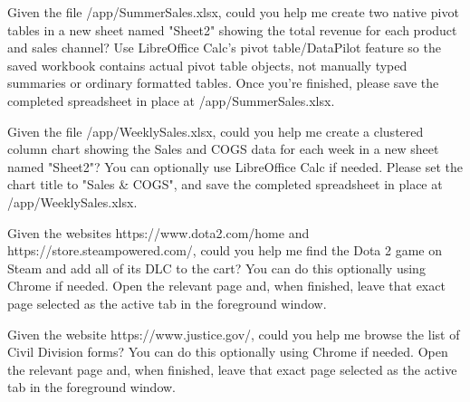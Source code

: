 \documentclass{llmxive}
\begin{document}
\begin{instructionbox}
Given the file \textasciigrave{}/app/SummerSales.xlsx\textasciigrave{}, could you help me create two native pivot tables in a new sheet named "Sheet2" showing the total revenue for each product and sales channel? Use LibreOffice Calc's pivot table/DataPilot feature so the saved workbook contains actual pivot table objects, not manually typed summaries or ordinary formatted tables. Once you're finished, please save the completed spreadsheet in place at \textasciigrave{}/app/SummerSales.xlsx\textasciigrave{}.
\end{instructionbox}

\begin{instructionbox}
Given the file \textasciigrave{}/app/WeeklySales.xlsx\textasciigrave{}, could you help me create a clustered column chart showing the Sales and COGS data for each week in a new sheet named "Sheet2"? You can optionally use LibreOffice Calc if needed. Please set the chart title to "Sales \& COGS", and save the completed spreadsheet in place at \textasciigrave{}/app/WeeklySales.xlsx\textasciigrave{}.
\end{instructionbox}

\begin{instructionbox}
Given the websites \textasciigrave{}https://www.dota2.com/home\textasciigrave{} and \textasciigrave{}https://store.steampowered.com/\textasciigrave{}, could you help me find the Dota 2 game on Steam and add all of its DLC to the cart? You can do this optionally using Chrome if needed. Open the relevant page and, when finished, leave that exact page selected as the active tab in the foreground window.
\end{instructionbox}

\begin{instructionbox}
Given the website \textasciigrave{}https://www.justice.gov/\textasciigrave{}, could you help me browse the list of Civil Division forms? You can do this optionally using Chrome if needed. Open the relevant page and, when finished, leave that exact page selected as the active tab in the foreground window.
\end{instructionbox}
\end{document}
